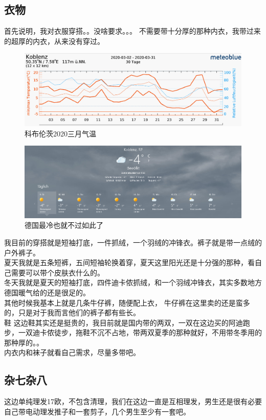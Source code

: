\documentclass[doku.tex]{subfiles}
\begin{document}
	\subsection{衣物}
首先说明，我对衣服穿搭。。没啥要求。。。 不需要带十分厚的那种内衣，我带过来的超厚的内衣，从来没有穿过。
\begin{figure}
	\centering
	\includegraphics[width=0.7\linewidth]{screenshot001}
	\caption{科布伦茨2020三月气温}
	\label{fig:screenshot001}
\end{figure}
\begin{figure}
	\centering
	\includegraphics[width=0.7\linewidth]{screenshot002}
	\caption{德国最冷也就不过如此了}
	\label{fig:screenshot002}
\end{figure}
我目前的穿搭就是短袖打底，一件抓绒，一个羽绒的冲锋衣。裤子就是带一点绒的户外裤子。\\
夏天我就是五条短裤，五间短袖轮换着穿，夏天这里阳光还是十分强的那种，看自己需要可以带个皮肤衣什么的。\\
冬天我就是夏天的短袖打底，四件迪卡侬抓绒，和一个羽绒冲锋衣，其实多数地方德国暖气给的还是很足的。\\
其他时候我基本上就是几条牛仔裤，随便配上衣，
牛仔裤在这里卖的还是蛮多的，只是对于我而言他们的裤子都有些长。\\
鞋 这边鞋其实还是挺贵的，我目前就是国内带的两双，一双在这边买的阿迪跑步，一双迪卡侬徒步，拖鞋不沉不占地，带两双夏季的那种就好，不用带冬季用的那种厚的。。\\
内衣内和袜子就看自己需求，尽量多带吧。

\subsection{杂七杂八}
这边单纯理发17欧，不包含清理，我们在这边一直是互相理发，男生还是很有必要自己带电动理发推子和一套剪子，几个男生至少有一套吧。
\end{document}
